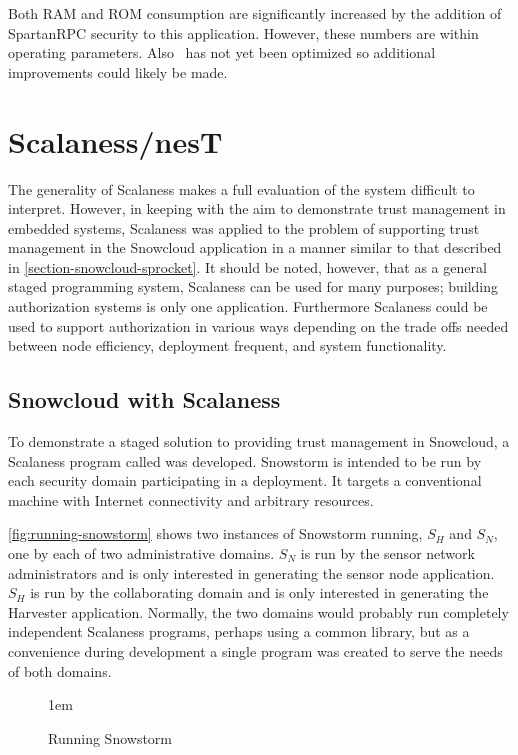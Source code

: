 Both RAM and ROM consumption are significantly increased by the addition of SpartanRPC security
to this application. However, these numbers are within operating parameters. Also \Sprocket\ has
not yet been optimized so additional improvements could likely be made.

\section{Scalaness/nesT}
\label{section-scalaness-evaluation}

The generality of Scalaness makes a full evaluation of the system difficult to interpret.
However, in keeping with the aim to demonstrate trust management in embedded systems, Scalaness
was applied to the problem of supporting trust management in the Snowcloud application in a
manner similar to that described in \autoref{section-snowcloud-sprocket}. It should be noted,
however, that as a general staged programming system, Scalaness can be used for many purposes;
building authorization systems is only one application. Furthermore Scalaness could be used to
support authorization in various ways depending on the trade offs needed between node
efficiency, deployment frequent, and system functionality.

\subsection{Snowcloud with Scalaness}

To demonstrate a staged solution to providing trust management in Snowcloud, a Scalaness program
called  was developed. Snowstorm is intended to be run by each security
domain participating in a deployment. It targets a conventional machine with Internet
connectivity and arbitrary resources.

\autoref{fig:running-snowstorm} shows two instances of Snowstorm running, $S_H$ and $S_N$, one
by each of two administrative domains. $S_N$ is run by the sensor network administrators and is
only interested in generating the sensor node application. $S_H$ is run by the collaborating
domain and is only interested in generating the Harvester application. Normally, the two domains
would probably run completely independent Scalaness programs, perhaps using a common library,
but as a convenience during development a single program was created to serve the needs of both
domains.

\begin{figure}[t]
  
  \centerline{\raise 1em\box\graph}
  \caption{Running Snowstorm}
  \label{fig:running-snowstorm}
\end{figure}

